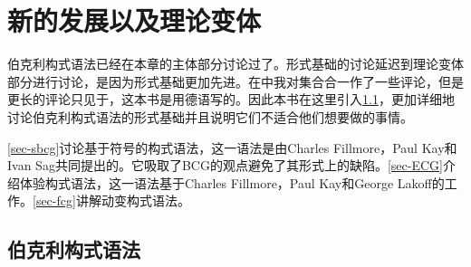 \section{新的发展以及理论变体}

伯克利构式语法已经在本章的主体部分讨论过了。形式基础的讨论延迟到理论变体部分进行讨论，是因为形式基础更加先进。在中我对集合合一作了一些评论，但是更长的评论只见于，这本书是用德语写的。因此本书在这里引入\ref{sec-formal-bcg}，更加详细地讨论伯克利构式语法的形式基础并且说明它们不适合他们想要做的事情。

\ref{sec-sbcg}讨论基于符号的构式语法，这一语法是由Charles Fillmore，Paul Kay和Ivan Sag共同提出的。它吸取了BCG的观点避免了其形式上的缺陷。\ref{sec-ECG}介绍体验构式语法，这一语法基于Charles Fillmore，Paul Kay和George Lakoff的工作。\ref{sec-fcg}讲解动变构式语法。

\subsection{伯克利构式语法}
\label{sec-formal-bcg}


